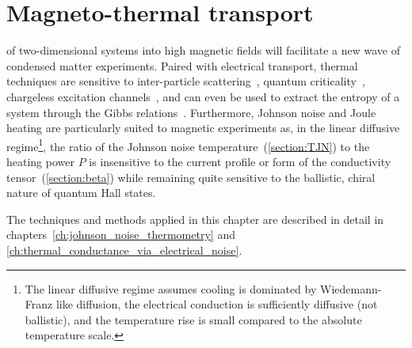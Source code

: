 

\chapter{Magneto-thermal transport}
\label{ch:magneto-thermal_transport}
 of two-dimensional systems into high magnetic fields will facilitate a new wave of condensed matter experiments. Paired with electrical transport, thermal techniques are sensitive to inter-particle scattering~\cite{??}, quantum criticality~\cite{??}, chargeless excitation channels~\cite{??}, and can even be used to extract the entropy of a system through the Gibbs relations~\cite{??}. Furthermore, Johnson noise and Joule heating are particularly suited to magnetic experiments as, in the linear diffusive regime\footnote{The linear diffusive regime assumes cooling is dominated by Wiedemann-Franz like diffusion, the electrical conduction is sufficiently diffusive (not ballistic), and the temperature rise is small compared to the absolute temperature scale.}, the ratio of the Johnson noise temperature~(\ref{section:TJN}) to the heating power $P$ is insensitive to the current profile or form of the conductivity tensor~(\ref{section:beta}) while remaining quite sensitive to the ballistic, chiral nature of quantum Hall states.

The techniques and methods applied in this chapter are described in detail in chapters~\ref{ch:johnson_noise_thermometry} and \ref{ch:thermal_conductance_via_electrical_noise}.

